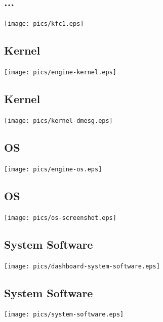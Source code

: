 \documentclass[xga]{xdvislides}
\begin{document}
\subsection{...}
\begin{center}
	\texttt{[image: pics/kfc1.eps]}
\end{center}

\subsection{Kernel}
\begin{center}
	\texttt{[image: pics/engine-kernel.eps]}
\end{center}

\subsection{Kernel}
\begin{center}
	\texttt{[image: pics/kernel-dmesg.eps]}
\end{center}

\subsection{OS}
\begin{center}
	\texttt{[image: pics/engine-os.eps]}
\end{center}

\subsection{OS}
\begin{center}
	\texttt{[image: pics/os-screenshot.eps]}
\end{center}

\subsection{System Software}
\begin{center}
	\texttt{[image: pics/dashboard-system-software.eps]}
\end{center}

\subsection{System Software}
\begin{center}
	\texttt{[image: pics/system-software.eps]}
\end{center}
\end{document}

